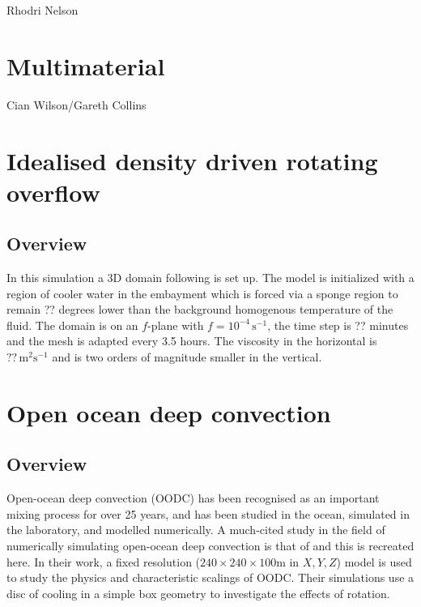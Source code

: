 Rhodri Nelson


\section{Multimaterial}
\label{sect:multimaterial}

Cian Wilson/Gareth Collins





\section{Idealised density driven rotating overflow}
\label{sect:DOME}
\subsection{Overview}
In this simulation a 3D domain following \cite{DOME} is set
up. The model is initialized with a region of cooler water in the
embayment which is forced via a sponge region to remain ?? degrees
lower than the background homogenous temperature of the fluid.  The
domain is on an $f$-plane with $f=10^{-4}\,\textrm{s}^{-1}$, the time step is ??
minutes and the mesh is adapted every 3.5 hours. The viscosity in the
horizontal is $??\,\textrm{m}^{2}\textrm{s}^{-1}$ and is two orders of magnitude smaller
in the vertical. 



\section{Open ocean deep convection}
\label{sect:OODC}
\subsection{Overview}
Open-ocean deep convection (OODC) has been recognised as an
important mixing process for over 25 years, and
has been studied in the ocean, simulated in the laboratory, and modelled numerically.
A much-cited study in the field of numerically simulating
open-ocean deep convection is that of \cite{jones1993} and this is recreated here.
In their work, a fixed resolution ($240 \times 240 \times
100$m in $X, Y, Z$) model is used to study the physics and
characteristic scalings of OODC. Their simulations use a disc
of cooling in a simple box geometry to investigate the effects of rotation.

